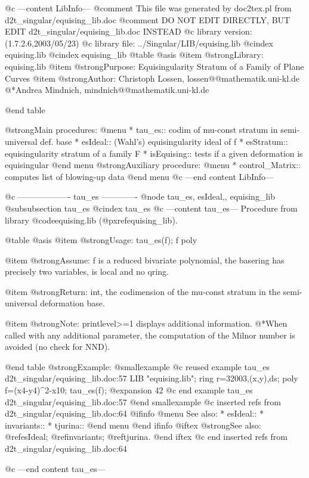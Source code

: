 @c ---content LibInfo---
@comment This file was generated by doc2tex.pl from d2t_singular/equising_lib.doc
@comment DO NOT EDIT DIRECTLY, BUT EDIT d2t_singular/equising_lib.doc INSTEAD
@c library version: (1.7.2.6,2003/05/23)
@c library file: ../Singular/LIB/equising.lib
@cindex equising.lib
@cindex equising_lib
@table @asis
@item @strong{Library:}
equising.lib
@item @strong{Purpose:}
  Equisingularity Stratum of a Family of Plane Curves
@item @strong{Author:}
Christoph Lossen, lossen@@mathematik.uni-kl.de
@*Andrea Mindnich, mindnich@@mathematik.uni-kl.de

@end table

@strong{Main procedures:}
@menu
* tau_es:: codim of mu-const stratum in semi-universal def. base
* esIdeal:: (Wahl's) equisingularity ideal of f
* esStratum:: equisingularity stratum of a family F
* isEquising:: tests if a given deformation is equisingular
@end menu
@strong{Auxiliary procedure:}
@menu
* control_Matrix:: computes list of blowing-up data
@end menu
@c ---end content LibInfo---

@c ------------------- tau_es -------------
@node tau_es, esIdeal,, equising_lib
@subsubsection tau_es
@cindex tau_es
@c ---content tau_es---
Procedure from library @code{equising.lib} (@pxref{equising_lib}).

@table @asis
@item @strong{Usage:}
tau_es(f); f poly

@item @strong{Assume:}
f is a reduced bivariate polynomial, the basering has precisely
two variables, is local and no qring.

@item @strong{Return:}
int, the codimension of the mu-const stratum in the semi-universal
deformation base.

@item @strong{Note:}
printlevel>=1 displays additional information.
@*When called with any additional parameter, the computation of the
Milnor number is avoided (no check for NND).

@end table
@strong{Example:}
@smallexample
@c reused example tau_es d2t_singular/equising_lib.doc:57 
LIB "equising.lib";
ring r=32003,(x,y),ds;
poly f=(x4-y4)^2-x10;
tau_es(f);
@expansion{} 42
@c end example tau_es d2t_singular/equising_lib.doc:57
@end smallexample
@c inserted refs from d2t_singular/equising_lib.doc:64
@ifinfo
@menu
See also:
* esIdeal::
* invariants::
* tjurina::
@end menu
@end ifinfo
@iftex
@strong{See also:}
@ref{esIdeal};
@ref{invariants};
@ref{tjurina}.
@end iftex
@c end inserted refs from d2t_singular/equising_lib.doc:64

@c ---end content tau_es---

